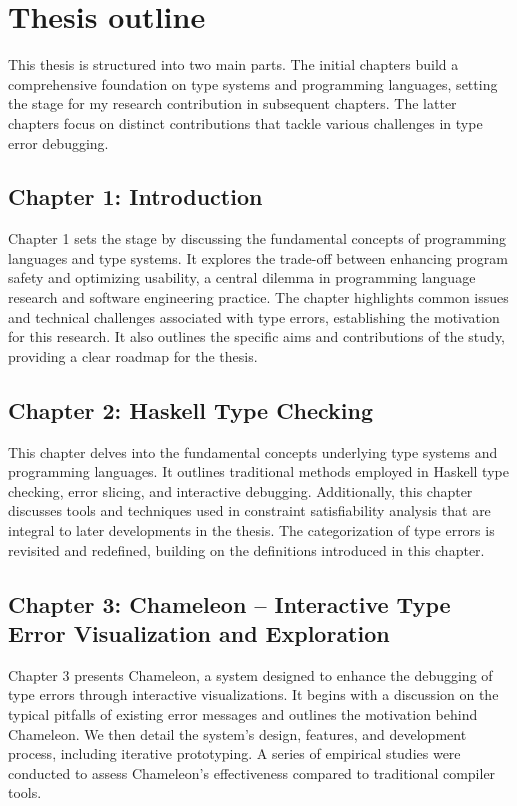 


\section{Thesis outline}

 This thesis is structured into two main parts. The initial chapters build a comprehensive foundation on type systems and programming languages, setting the stage for my research contribution in subsequent chapters. The latter chapters focus on distinct contributions that tackle various challenges in type error debugging.

\subsection{Chapter 1: Introduction}
Chapter 1 sets the stage by discussing the fundamental concepts of programming languages and type systems. It explores the trade-off between enhancing program safety and optimizing usability, a central dilemma in programming language research and software engineering practice. The chapter highlights common issues and technical challenges associated with type errors, establishing the motivation for this research. It also outlines the specific aims and contributions of the study, providing a clear roadmap for the thesis.

\subsection{Chapter 2: Haskell Type Checking}
This chapter delves into the fundamental concepts underlying type systems and programming languages. It outlines traditional methods employed in Haskell type checking, error slicing, and interactive debugging. Additionally, this chapter discusses tools and techniques used in constraint satisfiability analysis that are integral to later developments in the thesis. The categorization of type errors is revisited and redefined, building on the definitions introduced in this chapter.
    
\subsection{Chapter 3: Chameleon -- Interactive Type Error Visualization and Exploration}
Chapter 3 presents Chameleon, a system designed to enhance the debugging of type errors through interactive visualizations. It begins with a discussion on the typical pitfalls of existing error messages and outlines the motivation behind Chameleon. We then detail the system's design, features, and development process, including iterative prototyping. A series of empirical studies were conducted to assess Chameleon's effectiveness compared to traditional compiler tools.
    
